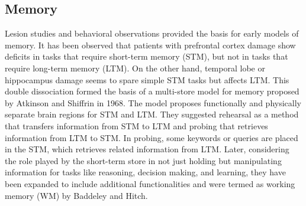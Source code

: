 \documentclass[reprint,amsmath,amssymb,apr,aip,onecolumn, 11pt]{revtex4-1}
\begin{document}
 

\subsection{Memory}


Lesion studies and behavioral observations provided the basis for early models of memory. It has been observed that patients with prefrontal cortex damage show deficits in tasks that require short-term memory (STM), but not in tasks that require long-term memory (LTM). On the other hand, temporal lobe or hippocampus damage seems to spare simple STM tasks but affects LTM. This double dissociation formed the basis of a multi-store model for memory proposed by Atkinson and Shiffrin\cite{ATKINSON1968, Atkinson_1971} in 1968. The model proposes functionally and physically separate brain regions for STM and LTM.  They suggested rehearsal as a method that transfers information from STM to LTM and probing that retrieves information from LTM to STM. In probing, some keywords or queries are placed in the STM, which retrieves related information from LTM. Later, considering the role played by the short-term store in not just holding but manipulating information for tasks like reasoning, decision making, and learning, they have been expanded to include additional functionalities and were termed as working memory (WM) by Baddeley and Hitch\cite{BADDELEY1974}.  
\end{document}
